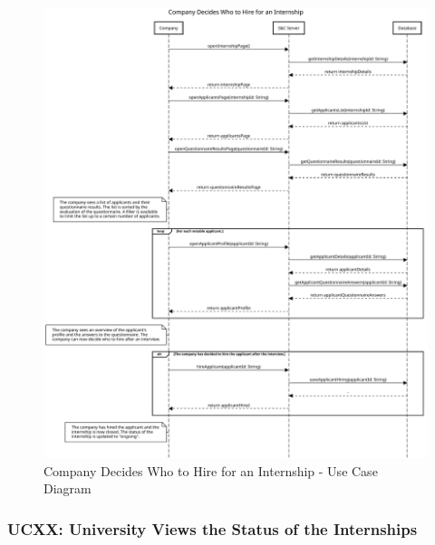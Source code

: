 \begin{figure}[H]
    \centering
    \includegraphics[width=1.0\textwidth]{Images/UC_14A.pdf}
    \caption{Company Decides Who to Hire for an Internship - Use Case Diagram}
    \label{fig:use-case-diagram-14A}
\end{figure}


\subsubsection{UCXX: University Views the Status of the Internships}
\label{subsubsec:university-views-the-status-of-the-internships}


